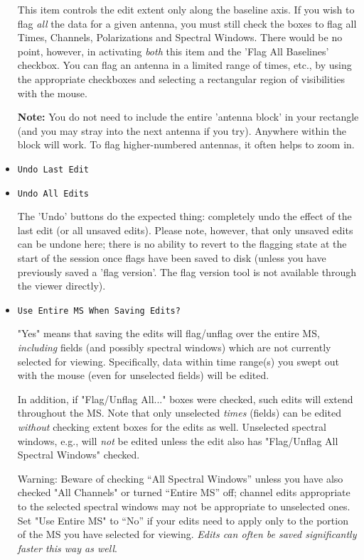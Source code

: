 \begin{itemize}
This item controls the edit extent only along the baseline axis.  If you
wish to flag {\it all} the data for a given antenna, you must still check
the boxes to flag all Times, Channels, Polarizations and Spectral Windows.
There would be no point, however, in activating {\it both} this item and
the 'Flag All Baselines' checkbox.  You can flag an antenna in a limited
range of times, etc., by using the appropriate checkboxes and selecting
a rectangular region of visibilities with the mouse. 

{\bf Note:} You do not need to include the entire 'antenna block' in your
rectangle (and you may stray into the next antenna if you try). Anywhere
within the block will work.  To flag higher-numbered antennas, it often
helps to zoom in.

\item {\tt Undo Last Edit}

\item {\tt Undo All Edits}

The 'Undo' buttons do the expected thing: completely undo the effect of
the last edit (or all unsaved edits).  Please note,
however, that only unsaved edits can be undone here;
there is no ability to revert to the flagging state at the start of the
session once flags have been saved to disk (unless you have previously
saved a 'flag version'.  The flag version tool is not available through
the viewer directly).

\item {\tt Use Entire MS When Saving Edits?}

"Yes" means that saving the edits will flag/unflag over the entire MS,
{\it including} fields (and possibly spectral windows) which are not 
currently selected for viewing.  Specifically, data within time range(s)
you swept out with the mouse (even for unselected fields) will be edited.

In addition, if "Flag/Unflag All..." boxes were checked, such edits will
extend throughout the MS.  Note that only
unselected {\it times} (fields) can be edited {\it without} checking
extent boxes for the edits as well.  Unselected spectral windows, e.g.,
will {\it not} be edited unless the edit also has "Flag/Unflag All
Spectral Windows" checked.  

Warning: Beware of checking ``All Spectral Windows'' unless you have also 
checked "All Channels" or turned ``Entire MS'' off; channel edits appropriate 
to the selected spectral windows may not be appropriate to unselected
ones.  Set "Use Entire MS" to ``No'' if your edits need to apply only to the
portion of the MS you have selected for viewing.  {\it Edits can often be
saved significantly faster this way as well}.


\end{itemize}
